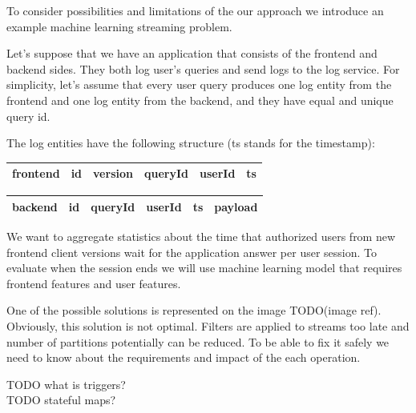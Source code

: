 To consider possibilities and limitations of the our approach we introduce an example machine learning streaming problem.

Let's suppose that we have an application that consists of the frontend and backend sides.
They both log user's queries and send logs to the log service.
For simplicity, let's assume that every user query produces one log entity from the frontend and one log entity from the backend, and they have equal and unique query id.

The log entities have the following structure (ts stands for the timestamp):

\begin{tabular}{|l|lllll|}
    \hline
    \textbf{frontend} & id & version & queryId & userId & ts \\
    \hline
\end{tabular}

\vspace{0.1em}

\begin{tabular}{|l|lllll|}
    \hline
    \textbf{backend} & id & queryId & userId & ts & payload \\
    \hline
\end{tabular}

We want to aggregate statistics about the time that authorized users from new frontend client versions wait for the application answer per user session.
To evaluate when the session ends we will use machine learning model that requires frontend features and user features.

One of the possible solutions is represented on the image TODO(image ref).
Obviously, this solution is not optimal.
Filters are applied to streams too late and number of partitions potentially can be reduced.
To be able to fix it safely we need to know about the requirements and impact of the each operation.

TODO what is triggers? \\
TODO stateful maps?

